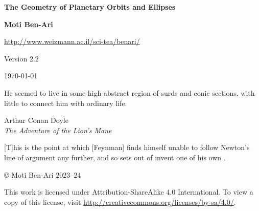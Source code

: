 


\thispagestyle{empty}

\begin{center}
\textbf{\LARGE The Geometry of Planetary Orbits and Ellipses}

\bigskip
\bigskip
\bigskip

\textbf{\Large Moti Ben-Ari}

\bigskip

\url{http://www.weizmann.ac.il/sci-tea/benari/}

\bigskip

Version 2.2

\bigskip

\today

\end{center}

\vspace*{8ex}

\hfill\begin{minipage}{.5\textwidth}
\small He seemed to live in some high abstract region of surds and conic sections, with little to connect him with ordinary life.
\begin{flushright}
Arthur Conan Doyle\\\textit{The Adventure of the Lion’s Mane}
\end{flushright}
\end{minipage}

\vspace*{8ex}

\hfill\begin{minipage}{.5\textwidth}
[T]his is the point at which [Feynman] finds himself unable to follow Newton's line of argument any further, and so sets out of invent one of his own \cite[p.~111]{lost}.
\end{minipage}

\vfill

\begin{center}
\copyright{} Moti Ben-Ari $2023$--$24$
\end{center}
 
\begin{small}
This work is licensed under Attribution-ShareAlike 4.0 International. To view a copy of this license, visit \url{http://creativecommons.org/licenses/by-sa/4.0/}.
\end{small}

